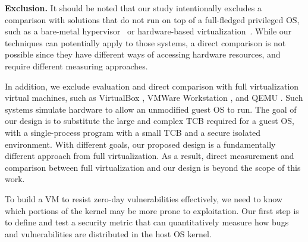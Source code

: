 \noindent
\textbf{Exclusion.}
It should be noted that our study intentionally excludes %
a comparison with solutions that do not run on top of a
full-fledged privileged OS, such as
a bare-metal hypervisor~\cite{Xen-03, VMWare-Server} or
hardware-based virtualization~\cite{IntelVT, keller2010nohype}.
While our techniques can potentially apply to those
systems, a direct comparison is not possible since they have different
ways of accessing hardware resources, and require different measuring approaches.

In addition, we exclude evaluation and direct comparison with full virtualization virtual machines,
such as VirtualBox \cite{VirtualBox}, VMWare Workstation \cite{VMWare-Workstation}, and QEMU \cite{QEMU}.
Such systems simulate hardware to allow an unmodified guest OS to run. The goal
of our design is to substitute the large and complex TCB required for a guest OS, with a single-process
program with a small TCB and a secure isolated environment. With different goals, our proposed design is 
a fundamentally different approach from full virtualization. As a result, direct measurement and comparison between full virtualization
and our design is
beyond the scope of this work.

To build a VM to resist zero-day vulnerabilities effectively, we need to know which
portions of the kernel may be more prone to exploitation. Our first step is to
define and test a security metric that can quantitatively measure how bugs and
vulnerabilities are distributed in the host OS kernel.
